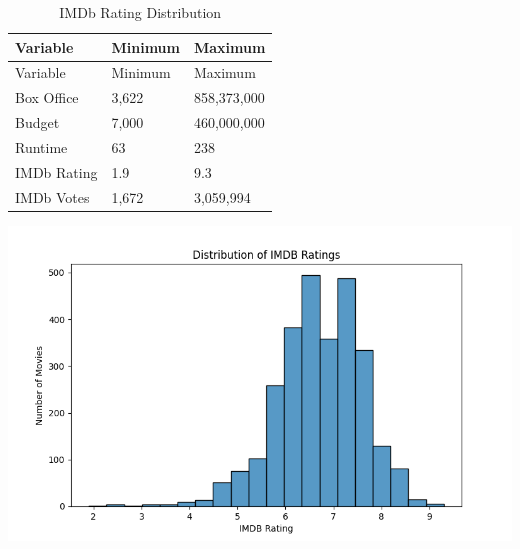 \documentclass[
]{agujournal2019}
\begin{document}
\begin{longtable}[]{@{}lll@{}}
\caption{IMDb Rating Distribution}\label{tbl-1}\tabularnewline
\toprule\noalign{}
Variable & Minimum & Maximum \\
\midrule\noalign{}
\endfirsthead
\toprule\noalign{}
Variable & Minimum & Maximum \\
\midrule\noalign{}
\endhead
\bottomrule\noalign{}
\endlastfoot
Box Office & 3,622 & 858,373,000 \\
Budget & 7,000 & 460,000,000 \\
Runtime & 63 & 238 \\
IMDb Rating & 1.9 & 9.3 \\
IMDb Votes & 1,672 & 3,059,994 \\
\end{longtable}

\includegraphics{./notebooks/notebook_output/imdb_rating.png}
\end{document}
